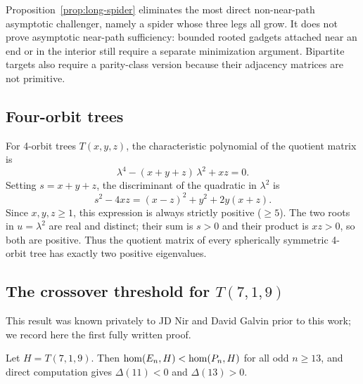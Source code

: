 \begin{remark}
  Proposition~\ref{prop:long-spider} eliminates the most direct
  non-near-path asymptotic challenger, namely a spider whose three legs all
  grow. It does not prove asymptotic near-path sufficiency: bounded rooted
  gadgets attached near an end or in the interior still require a separate
  minimization argument. Bipartite targets also require a parity-class
  version because their adjacency matrices are not primitive.
\end{remark}

\subsection{Four-orbit trees}

For 4-orbit trees $T(x,y,z)$, the characteristic polynomial of the
quotient matrix is
\begin{equation}
  \label{eq:charpoly}
  \lambda^4 - (x+y+z)\,\lambda^2 + xz = 0.
\end{equation}
Setting $s = x + y + z$, the discriminant of the quadratic in
$\lambda^2$ is
\[
  s^2 - 4xz = (x - z)^2 + y^2 + 2y(x + z).
\]
Since $x, y, z \ge 1$, this expression is always strictly positive
($\ge 5$). The two roots in $u=\lambda^2$ are real and distinct; their
sum is $s>0$ and their product is $xz>0$, so both are positive. Thus
the quotient matrix of every spherically symmetric 4-orbit tree has
exactly two positive eigenvalues.

\subsection{The crossover threshold for \texorpdfstring{$T(7,1,9)$}{T(7,1,9)}}

This result was known privately to JD Nir and David Galvin prior to this work;
we record here the first fully written proof.

\begin{theorem}
  \label{thm:threshold}
  Let $H = T(7,1,9)$. Then $\mathrm{hom}(E_n, H) < \mathrm{hom}(P_n, H)$ for all
  odd $n \ge 13$, and direct computation gives $\Delta(11) < 0$ and
  $\Delta(13) > 0$.
\end{theorem}

